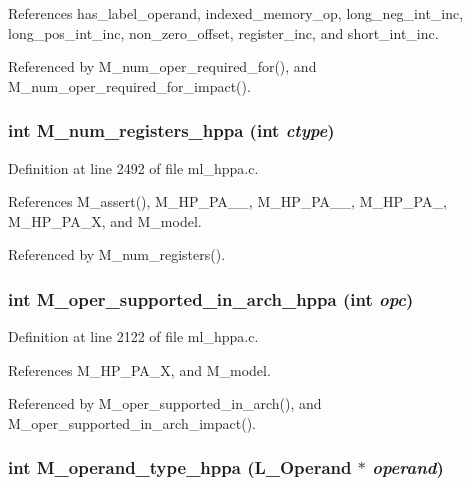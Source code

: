 References has\_\-label\_\-operand, indexed\_\-memory\_\-op, long\_\-neg\_\-int\_\-inc, long\_\-pos\_\-int\_\-inc, non\_\-zero\_\-offset, register\_\-inc, and short\_\-int\_\-inc.

Referenced by M\_\-num\_\-oper\_\-required\_\-for(), and M\_\-num\_\-oper\_\-required\_\-for\_\-impact().
\subsubsection{\setlength{\rightskip}{0pt plus 5cm}int M\_\-num\_\-registers\_\-hppa (int {\em ctype})}\label{ml__hppa_8c_2877b550b4883ca3f13ebc597809593e}




Definition at line 2492 of file ml\_\-hppa.c.

References M\_\-assert(), M\_\-HP\_\-PA\_\_, M\_\-HP\_\-PA\_\_, M\_\-HP\_\-PA\_, M\_\-HP\_\-PA\_\-X, and M\_\-model.

Referenced by M\_\-num\_\-registers().
\subsubsection{\setlength{\rightskip}{0pt plus 5cm}int M\_\-oper\_\-supported\_\-in\_\-arch\_\-hppa (int {\em opc})}\label{ml__hppa_8c_abb2dba60a9f9529009d31eaa55a5840}




Definition at line 2122 of file ml\_\-hppa.c.

References M\_\-HP\_\-PA\_\-X, and M\_\-model.

Referenced by M\_\-oper\_\-supported\_\-in\_\-arch(), and M\_\-oper\_\-supported\_\-in\_\-arch\_\-impact().
\subsubsection{\setlength{\rightskip}{0pt plus 5cm}int M\_\-operand\_\-type\_\-hppa (L\_\-Operand $\ast$ {\em operand})}\label{ml__hppa_8c_324c65ae6f64ef5b6b79a81834ac1924}




